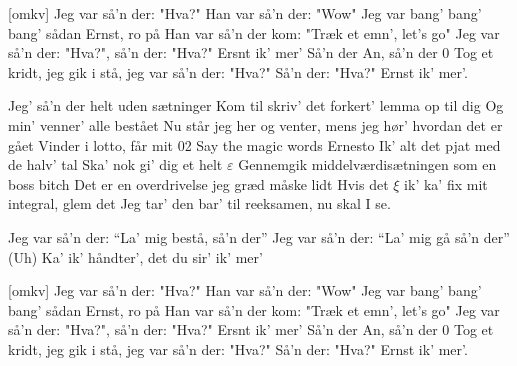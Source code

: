 \documentclass[a4paper,11pt]{article}
\begin{document}
\begin{song}
[omkv]%
Jeg var så'n der: "Hva?" Han var så'n der: "Wow"
Jeg var bang' bang' bang' sådan Ernst, ro på
Han var så'n der kom: "Træk et emn', let's go"
Jeg var så'n der: "Hva?", så'n der: "Hva?" Ersnt ik' mer'
Så'n der An, så'n der 0
Tog et kridt, jeg gik i stå,
jeg var så'n der: "Hva?" Så'n der: "Hva?" Ernst ik' mer'.

%
Jeg' så'n der helt uden sætninger
Kom til skriv' det forkert' lemma op til dig
Og min' venner' alle bestået
Nu står jeg her og venter, mens jeg hør' hvordan det er gået
Vinder i lotto, får mit 02
Say the magic words Ernesto
Ik' alt det pjat med de halv' tal
Ska' nok gi' dig et helt $\varepsilon$
Gennemgik middelværdisætningen som en boss bitch
Det er en overdrivelse jeg græd måske lidt
Hvis det $\xi$ ik' ka' fix mit integral, glem det
Jeg tar' den bar' til reeksamen, nu skal I se.

%
Jeg var så'n der: “La' mig bestå, så'n der”
Jeg var så'n der: “La' mig gå så'n der” (Uh)
Ka' ik' håndter', det du sir' ik' mer'

[omkv]%
Jeg var så'n der: "Hva?" Han var så'n der: "Wow"
Jeg var bang' bang' bang' sådan Ernst, ro på
Han var så'n der kom: "Træk et emn', let's go"
Jeg var så'n der: "Hva?", så'n der: "Hva?" Ersnt ik' mer'
Så'n der An, så'n der 0
Tog et kridt, jeg gik i stå,
jeg var så'n der: "Hva?" Så'n der: "Hva?" Ernst ik' mer'.
\end{song}
\end{document}
